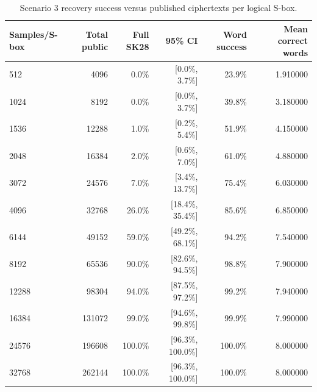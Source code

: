 \begin{table}[t]
\centering
\caption{Scenario 3 recovery success versus published ciphertexts per logical S-box.}
\label{tab:s3-success-curve}
\begin{tabular}{lrrrrr}
\toprule
Samples/S-box & Total public & Full SK28 & 95\% CI & Word success & Mean correct words \\
\midrule
512 & 4096 & 0.0\% & [0.0\%, 3.7\%] & 23.9\% & 1.910000 \\
1024 & 8192 & 0.0\% & [0.0\%, 3.7\%] & 39.8\% & 3.180000 \\
1536 & 12288 & 1.0\% & [0.2\%, 5.4\%] & 51.9\% & 4.150000 \\
2048 & 16384 & 2.0\% & [0.6\%, 7.0\%] & 61.0\% & 4.880000 \\
3072 & 24576 & 7.0\% & [3.4\%, 13.7\%] & 75.4\% & 6.030000 \\
4096 & 32768 & 26.0\% & [18.4\%, 35.4\%] & 85.6\% & 6.850000 \\
6144 & 49152 & 59.0\% & [49.2\%, 68.1\%] & 94.2\% & 7.540000 \\
8192 & 65536 & 90.0\% & [82.6\%, 94.5\%] & 98.8\% & 7.900000 \\
12288 & 98304 & 94.0\% & [87.5\%, 97.2\%] & 99.2\% & 7.940000 \\
16384 & 131072 & 99.0\% & [94.6\%, 99.8\%] & 99.9\% & 7.990000 \\
24576 & 196608 & 100.0\% & [96.3\%, 100.0\%] & 100.0\% & 8.000000 \\
32768 & 262144 & 100.0\% & [96.3\%, 100.0\%] & 100.0\% & 8.000000 \\
\bottomrule
\end{tabular}
\end{table}
